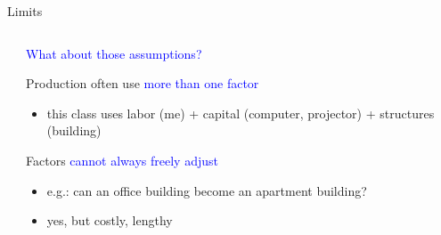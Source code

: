 \documentclass[notes,11pt, aspectratio=169, xcolor=table]{beamer}
\newcommand{\blue}[1]{\textcolor{blue}{#1}}
\newenvironment{wideitemize}{\itemize\addtolength{\itemsep}{10pt}}{\enditemize}
\begin{document}
\begin{frame}{Limits}


\begin{columns}[T] %
\begin{column}{.4\textwidth}
\centering
{}
\end{column}%
\hfill%
\begin{column}{.6\textwidth}
\blue{What about those assumptions?}

\begin{wideitemize}
    \item<1-> Production often use \blue{more than one factor}
    \begin{itemize}
        \item this class uses labor (me) + capital (computer, projector) + structures (building)
    \end{itemize}
    
    \item<2-> Factors \blue{cannot always freely adjust} 
    \begin{itemize}
        \item e.g.: can an office building become an apartment building?
        \item<3-> yes, but costly, lengthy 
    \end{itemize}


\end{wideitemize}
\end{column}
\end{columns}
\end{frame}
\end{document}
